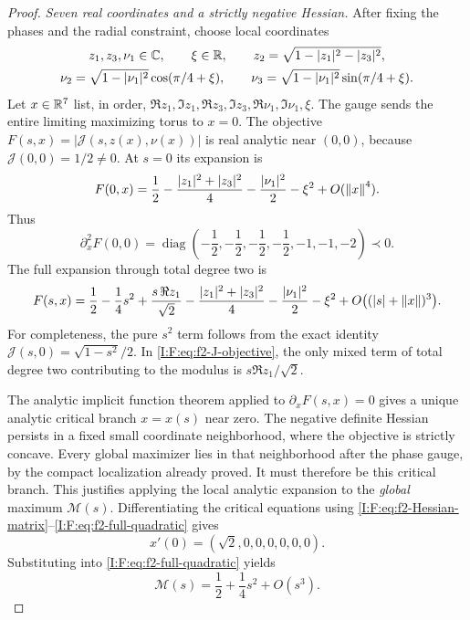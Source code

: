 \begin{proof}
\emph{Seven real coordinates and a strictly negative Hessian.}
After fixing the phases and the radial constraint, choose local
coordinates
\begin{equation}
 \begin{gathered}
 z_1,z_3,\nu_1\in\mathbb C,\qquad \xi\in\mathbb R,\qquad
 z_2=\sqrt{1-|z_1|^2-|z_3|^2},\\
 \nu_2=\sqrt{1-|\nu_1|^2}\cos(\pi/4+\xi),\qquad
 \nu_3=\sqrt{1-|\nu_1|^2}\sin(\pi/4+\xi).
 \end{gathered}
 \label{I:F:eq:f2-seven-coordinates}
\end{equation}
Let $x\in\mathbb R^7$ list, in order,
$\Re z_1,\Im z_1,\Re z_3,\Im z_3,\Re\nu_1,\Im\nu_1,\xi$.
The gauge sends the entire limiting maximizing torus to $x=0$.
The objective
$F(s,x)=|\mathcal J(s,z(x),\nu(x))|$ is real analytic near $(0,0)$,
because $\mathcal J(0,0)=1/2\ne0$.
At $s=0$ its expansion is
\begin{equation}
 F(0,x)=\frac12-\frac{|z_1|^2+|z_3|^2}{4}
                  -\frac{|\nu_1|^2}{2}-\xi^2+O(\left\lVert x\right\rVert^4).
 \label{I:F:eq:f2-transverse-Hessian}
\end{equation}
Thus
\begin{equation}
 \partial_x^2F(0,0)=
 \operatorname{diag}\!\left(-\frac12,-\frac12,-\frac12,-\frac12,
                           -1,-1,-2\right)\prec0.
 \label{I:F:eq:f2-Hessian-matrix}
\end{equation}
The full expansion through total degree two is
\begin{align}
 F(s,x)=\frac12-\frac14s^2+\frac{s\,\Re z_1}{\sqrt2}
          -\frac{|z_1|^2+|z_3|^2}{4}
          -\frac{|\nu_1|^2}{2}-\xi^2
          +O\bigl((|s|+\left\lVert x\right\rVert)^3\bigr).
 \label{I:F:eq:f2-full-quadratic}
\end{align}
For completeness, the pure $s^2$ term follows from the exact identity
$\mathcal J(s,0)=\sqrt{1-s^2}/2$.  In
\eqref{I:F:eq:f2-J-objective}, the only mixed term of total degree two
contributing to the modulus is $s\Re z_1/\sqrt2$.

The analytic implicit function theorem applied to
$\partial_xF(s,x)=0$ gives a unique analytic critical branch $x=x(s)$
near zero.  The negative definite Hessian persists in a fixed small
coordinate neighborhood, where the objective is strictly concave.
Every global maximizer lies in that neighborhood after the phase gauge,
by the compact localization already proved.  It must therefore be this
critical branch.  This justifies applying the local analytic expansion
to the \emph{global} maximum $\mathcal M(s)$.
Differentiating the critical equations using
\eqref{I:F:eq:f2-Hessian-matrix}--\eqref{I:F:eq:f2-full-quadratic} gives
\begin{equation}
 x'(0)=(\sqrt2,0,0,0,0,0,0).
 \label{I:F:eq:f2-critical-derivative}
\end{equation}
Substituting into \eqref{I:F:eq:f2-full-quadratic} yields
\begin{equation}
 \mathcal M(s)=\frac12+\frac14s^2+O(s^3).
 \label{I:F:eq:f2-M-preliminary}
\end{equation}


\end{proof}
